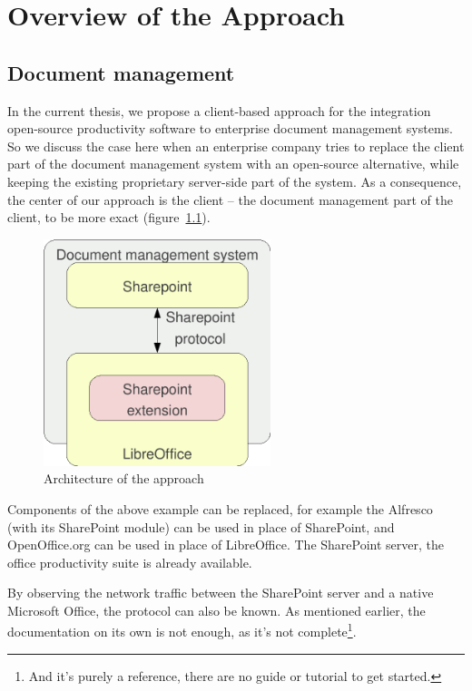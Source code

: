 \chapter{Overview of the Approach}

\section{Document management}

In the current thesis, we propose a client-based approach for the integration
open-source productivity software to enterprise document management systems. So
we discuss the case here when an enterprise company tries to replace the client
part of the document management system with an open-source alternative, while
keeping the existing proprietary server-side part of the system. As a
consequence, the center of our approach is the client -- the document management
part of the client, to be more exact (figure~\ref{fig:overview-architecture}).

\begin{figure}[H]
\centering
\includegraphics[width=250px,keepaspectratio]{overview-architecture.pdf}
\caption{Architecture of the approach}
\label{fig:overview-architecture}
\end{figure}

Components of the above example can be replaced, for example the Alfresco (with
its SharePoint module) can be used in place of SharePoint, and OpenOffice.org
can be used in place of LibreOffice. The SharePoint server, the office
productivity suite is already available.

By observing the network traffic between the SharePoint server and a native
Microsoft Office, the protocol can also be known. As mentioned earlier, the
documentation on its own is not enough, as it's not complete\footnote{And it's
purely a reference, there are no guide or tutorial to get started.}.

